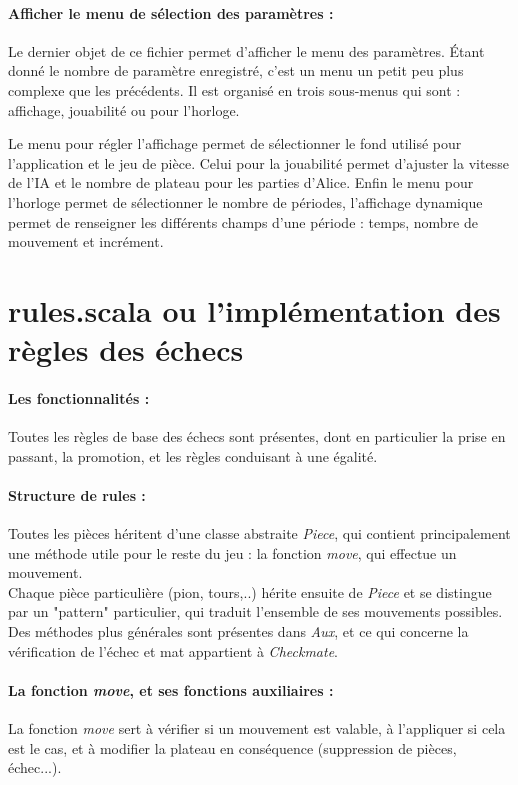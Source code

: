 \documentclass[a4paper]{article}
\begin{document}
\paragraph{Afficher le menu de sélection des paramètres :}Le dernier objet de ce fichier permet d'afficher le menu des paramètres. Étant donné le nombre de paramètre enregistré, c'est un menu un petit peu plus complexe que les précédents. Il est organisé en trois sous-menus qui sont : affichage, jouabilité ou pour l'horloge. 

Le menu pour régler l'affichage permet de sélectionner le fond utilisé pour l'application et le jeu de pièce. Celui pour la jouabilité permet d'ajuster la vitesse de l'IA et le nombre de plateau pour les parties d'Alice. Enfin le menu pour l'horloge permet de sélectionner le nombre de périodes, l'affichage dynamique permet de renseigner les différents champs d'une période : temps, nombre de mouvement et incrément. 

\section{rules.scala ou l'implémentation des règles des échecs}

\paragraph{Les fonctionnalités :} Toutes les règles de base des échecs sont présentes, dont en particulier la prise en passant, la promotion, et les règles conduisant à une égalité.

\paragraph{Structure de rules :} Toutes les pièces héritent d'une classe abstraite \textit{Piece}, qui contient principalement une méthode utile pour le reste du jeu : la fonction \textit{move}, qui effectue un mouvement. \\
Chaque pièce particulière (pion, tours,..) hérite ensuite de \textit{Piece} et se distingue par un "pattern" particulier, qui traduit l'ensemble de ses mouvements possibles. \\

Des méthodes plus générales sont présentes dans \textit{Aux}, et ce qui concerne la vérification de l'échec et mat appartient à \textit{Checkmate}.

\paragraph{La fonction \textit{move}, et ses fonctions auxiliaires :} La fonction \textit{move} sert à vérifier si un mouvement est valable, à l'appliquer si cela est le cas, et à modifier la plateau en conséquence (suppression de pièces, échec...). \\
\end{document}
